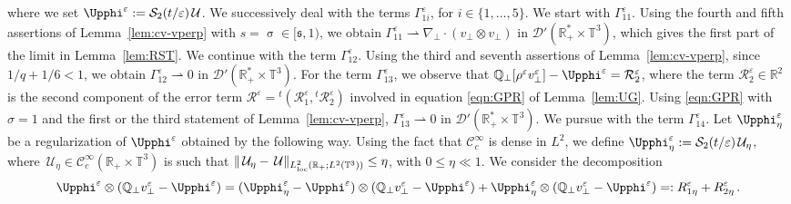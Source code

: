 \documentclass[11pt,reqno]{amsart}
\def \R{{\mathbb{R}}}
\def \Q{{\mathbb{Q}}}
\def \T{{\mathbb{T}}}
\begin{document}
where we set $\Upphi^\varepsilon:= \mathcal S_2(t/\varepsilon) \,\mathcal U$. We successively deal with the terms $\Gamma_{1i}^\varepsilon $,  for $i\in\{1, \ldots, 5  \}$. We start with  $\Gamma_{11}^\varepsilon $. Using the fourth and fifth assertions of Lemma~\ref{lem:cv-vperp} with $s=\upsigma \in [\mathfrak s , 1)$, we obtain $\Gamma_{11}^\varepsilon \rightharpoonup \nabla_\perp \cdot (v_\perp \otimes v_\perp)$ in $\mathcal D'(\R_+^* \times \T^3)$, which gives the first part of the limit in Lemma~\ref{lem:RST}. We continue with the term $\Gamma_{12}^\varepsilon$.  Using the third and seventh assertions of Lemma~\ref{lem:cv-vperp}, since $1/q+1/6< 1$,  we obtain $\Gamma_{12}^\varepsilon \rightharpoonup 0 $ in $\mathcal D'(\R_+^* \times \T^3)$. For the term $\Gamma_{13}^\varepsilon$, we observe that $\Q_\perp[\rho^\varepsilon v_\perp^\varepsilon]-\Upphi^\varepsilon=\mathcal R_2^\varepsilon$, where the term $\mathcal R_2^\varepsilon \in \R^2$ is the second component of the error term $\mathcal R^\varepsilon ={}^t(\mathcal R_1^\varepsilon,{}^t\mathcal R_2^\varepsilon)$ involved in equation \eqref{eqn:GPR} of Lemma~\ref{lem:UG}. Using \eqref{eqn:GPR} with $\sigma=1$ and the first or the third statement of Lemma~\ref{lem:cv-vperp}, $\Gamma_{13}^\varepsilon \rightharpoonup 0 $ in $\mathcal D'(\R_+^* \times \T^3)$. We pursue with the term $\Gamma_{14}^\varepsilon$. Let $\Upphi_\eta^\varepsilon$ be a regularization of $\Upphi^\varepsilon$ obtained by the following way. Using the fact that $\mathscr{C}_c^\infty$ is dense in $L^2$, we define $\Upphi_\eta^\varepsilon:=\mathcal S_2(t/\varepsilon)\, \mathcal U_\eta$, where $ \, \mathcal U_\eta \in \mathscr{C}_c^\infty(\R_+\times \T^3)$ is such that $\|\, \mathcal U_\eta -\, \mathcal U \|_{L_{\rm loc}^2(\R_+;L^2(\T^3))} \leq \eta$, with $0\leq \eta \ll 1$. We consider the decomposition
  \begin{equation}
    \label{eqn:RST-3}
    \Upphi^\varepsilon \otimes (\Q_\perp v_\perp^\varepsilon-\Upphi^\varepsilon) = (\Upphi_\eta^\varepsilon-\Upphi^\varepsilon)
     \otimes (\Q_\perp v_\perp^\varepsilon-\Upphi^\varepsilon)  + \Upphi_\eta^\varepsilon\otimes  (\Q_\perp v_\perp^\varepsilon-\Upphi^\varepsilon) =: R_{1\eta}^\varepsilon + R_{2\eta}^\varepsilon\,.  
  \end{equation}
\end{document}
